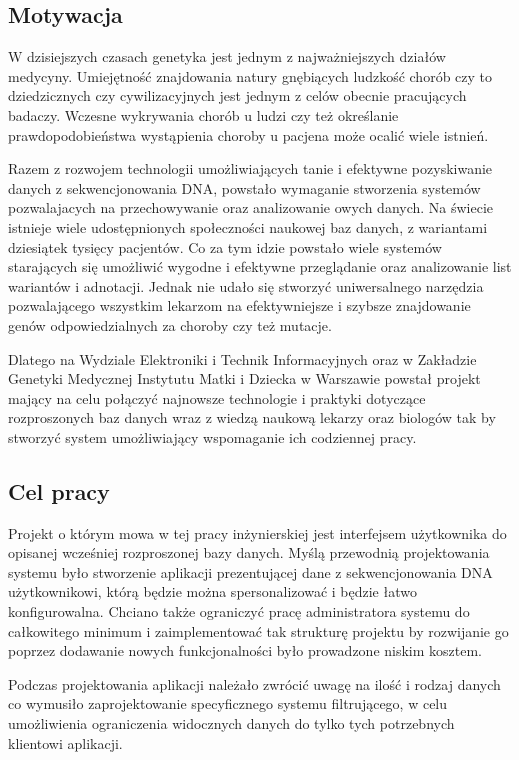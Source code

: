 \documentclass[a4paper,12pt,twoside]{article}
\begin{document}
\subsection{Motywacja}
W dzisiejszych czasach genetyka jest jednym z najważniejszych działów medycyny.
Umiejętność znajdowania natury gnębiących ludzkość chorób
czy to dziedzicznych czy cywilizacyjnych jest jednym z celów obecnie pracujących badaczy. Wczesne wykrywania chorób u ludzi czy też określanie
prawdopodobieństwa wystąpienia choroby u pacjena może ocalić
wiele istnień.

Razem z rozwojem technologii umożliwiających tanie i efektywne
pozyskiwanie danych z sekwencjonowania DNA, powstało wymaganie stworzenia
systemów pozwalajacych na przechowywanie oraz analizowanie owych danych.
Na świecie istnieje wiele udostępnionych społeczności naukowej baz danych,
z wariantami dziesiątek tysięcy pacjentów. Co za tym idzie powstało 
wiele systemów starających się umożliwić wygodne i efektywne 
przeglądanie oraz analizowanie list wariantów i adnotacji.
Jednak nie udało się stworzyć uniwersalnego narzędzia pozwalającego
wszystkim lekarzom na efektywniejsze i szybsze znajdowanie
genów odpowiedzialnych za choroby czy też mutacje.

Dlatego na Wydziale Elektroniki i Technik Informacyjnych 
oraz w Zakładzie Genetyki Medycznej Instytutu Matki i Dziecka w Warszawie
powstał projekt mający na celu połączyć najnowsze technologie i 
praktyki dotyczące rozproszonych baz danych wraz z wiedzą naukową
lekarzy oraz biologów tak by stworzyć system umożliwiający 
wspomaganie ich codziennej pracy.
  
\subsection{Cel pracy} 
Projekt o którym mowa w tej pracy inżynierskiej jest 
interfejsem użytkownika do opisanej wcześniej 
rozproszonej bazy danych.
Myślą przewodnią projektowania systemu było stworzenie aplikacji 
prezentującej dane z sekwencjonowania DNA użytkownikowi, którą będzie 
można spersonalizować i będzie łatwo konfigurowalna.
Chciano także ograniczyć pracę administratora systemu do
całkowitego minimum i zaimplementować tak strukturę projektu
by rozwijanie go poprzez dodawanie nowych funkcjonalności było
prowadzone niskim kosztem.

Podczas projektowania aplikacji należało zwrócić uwagę na
ilość i rodzaj danych co wymusiło zaprojektowanie specyficznego systemu
filtrującego, w celu umożliwienia ograniczenia widocznych danych
do tylko tych potrzebnych klientowi aplikacji.
\end{document}
